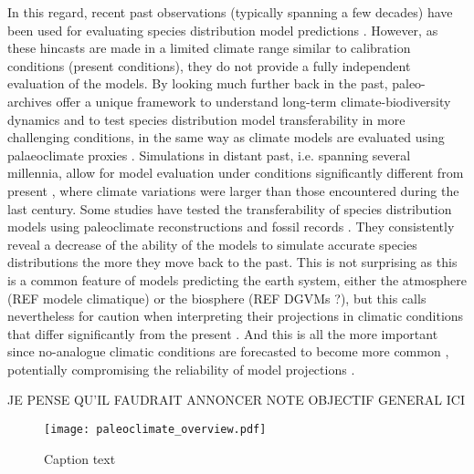 In this regard, recent past observations (typically spanning a few decades) have been used for evaluating species distribution model predictions \cite{Araujo2005, Kharouba2009, Smith2013, Illan2014}. However, as these hincasts are made in a limited climate range similar to calibration conditions (present conditions), they do not provide a fully independent evaluation of the models. By looking much further back in the past, paleo-archives offer a unique framework to understand long-term climate-biodiversity dynamics \cite{Fordham2020} and to test species distribution model transferability in more challenging conditions, in the same way as climate models are evaluated using palaeoclimate proxies \cite{Braconnot2012}. Simulations in distant past, i.e. spanning several millennia, allow for model evaluation under conditions significantly different from present \cite{Maguire2015}, where climate variations were larger than those encountered during the last century.
Some studies have tested the transferability of species distribution models using paleoclimate reconstructions and fossil records \cite{Veloz2012, Pearman2008, Williams2013, Roberts2012}. They consistently reveal a decrease of the ability of the models to simulate accurate species distributions the more they move back to the past. This is not surprising as this is a common feature of models predicting the earth system, either the atmosphere (REF modele climatique) or the biosphere (REF DGVMs ?), but this calls nevertheless for caution when interpreting their projections in climatic conditions that differ significantly from the present \cite{Maguire2016}. And this is all the more important since no-analogue climatic conditions are forecasted to become more common \cite{Williams2007}, potentially compromising the reliability of model projections \cite{Fitzpatrick2018}. 

JE PENSE QU'IL FAUDRAIT ANNONCER NOTE OBJECTIF GENERAL ICI



\begin{figure}[ht]
\centering
\texttt{[image: paleoclimate\_overview.pdf]}
\caption{Caption text}\label{paleoclimate_overview}
\end{figure}

\begin{comment}
While these investigations have yielded valuable insights into the reliability of species distribution models, they have primarily focused on correlative models, despite the growing interest for process-based models in predictive ecology \cite{Connolly2017, Urban2016, Pilowsky2022}.

This omission represents a notable gap in our understanding of the tenets of species distribution modelling, as only one side of the continuum between statistical and mechanistic approaches has been explored \cite{Dormann2012}, neglecting the investigation of process-based model performance. 
\end{comment}

